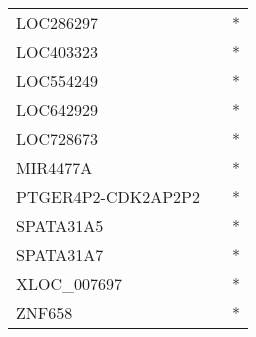 \begin{tabular}{lcc}
LOC286297          &                &          * \\
LOC403323          &                &          * \\
LOC554249          &                &          * \\
LOC642929          &                &          * \\
LOC728673          &                &          * \\
MIR4477A           &                &          * \\
PTGER4P2-CDK2AP2P2 &                &          * \\
SPATA31A5          &                &          * \\
SPATA31A7          &                &          * \\
XLOC\_007697        &                &          * \\
ZNF658             &                &          * \\
\bottomrule
\end{tabular}
